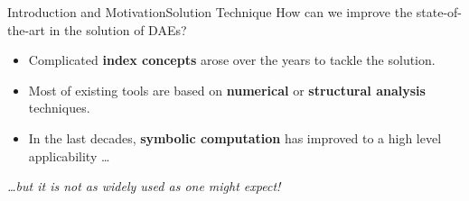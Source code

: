 \begin{frame}{Introduction and Motivation}{Solution Technique}
  How can we improve the state-of-the-art in the solution of \acp{DAE}?
  \begin{itemize}
    \item Complicated \textbf{index concepts} arose over the years to tackle the solution.
    \item Most of existing tools are based on \textbf{numerical} or \textbf{structural analysis} techniques.
    \item In the last decades, \textbf{symbolic computation} has improved to a high level applicability \dots \\
  \end{itemize}
  \vspace{1.0em}
  \centering\emph{\dots but it is not as widely used as one might expect!}
  \vspace{1.0em}
\end{frame}

